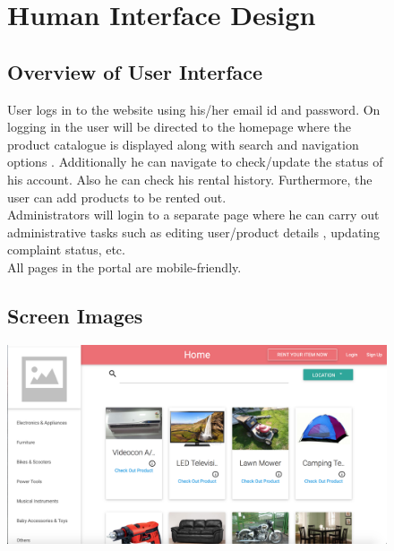 \documentclass[11pt]{report}
\begin{document}
\begin{figure}[h]
\section{Human Interface Design}

\subsection{Overview of User Interface}
User logs in to the website using his/her email id and password. On logging in the user will be directed to the homepage where the product catalogue is displayed along with search and navigation options . Additionally he can navigate to check/update the status of his account. Also he can check his rental history. Furthermore, the user  can add products to be rented out. 
\\Administrators will login to a separate page where he can carry out administrative tasks such as editing user/product details , updating complaint status, etc.\\
All pages in the portal are mobile-friendly.\\
\subsection{Screen Images}
\vspace{0.5in}
  \centering
    \includegraphics[width=6in]{homepage.png} 
    \end{figure}
\end{document}
